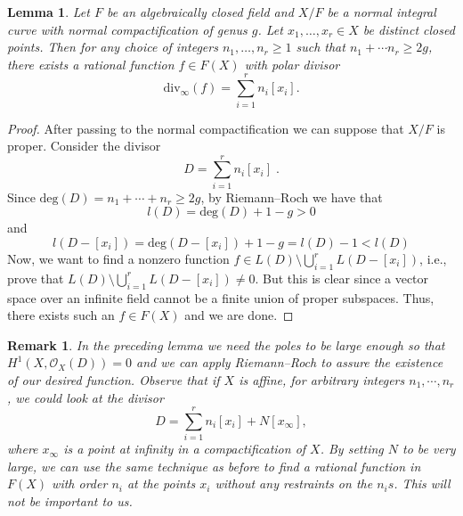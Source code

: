 \documentclass[a4paper,english,12pt]{amsart}
\newtheorem{lemma}[definition]{Lemma}
\newtheorem{remark}[definition]{Remark}
\numberwithin{equation}{section}
\renewcommand{\geq}{\geqslant}
\renewcommand{\_}{\rule{0.25cm}{0.4pt}}
\begin{document}
\begin{lemma}\label{approximation for curves}
    Let $F$ be an algebraically closed field and $X/F$ be a normal integral curve with normal compactification of genus $g$. Let $x_{1},\dots, x_{r}\in X$ be distinct closed points. Then for any choice of integers $n_{1},\dots, n_{r}\geq 1$ such that $n_{1}+\cdots n_{r}\geq 2g$, there exists a rational function $f\in F(X)$ with polar divisor
    \[
    \text{div}_{\infty}(f)=\sum_{i=1}^{r}n_{i}[x_{i}].
    \]
\end{lemma}
\begin{proof}
    After passing to the normal compactification we can suppose that $X/F$ is proper. Consider the divisor
    \[
    D=\sum_{i=1}^{r}n_{i}[x_{i}]\;.
    \]
    Since $\text{deg}(D)=n_{1}+\cdots +n_{r}\geq 2g$, by Riemann--Roch we have that
    \[
    l(D)=\text{deg}(D)+1-g>0
    \]
    and
    \[
    l(D-[x_{i}])=\text{deg}(D-[x_{i}])+1-g=l(D)-1< l(D)
    \]
    Now, we want to find a nonzero function $f\in L(D)\setminus \bigcup_{i=1}^{r}L(D-[x_{i}])$, i.e., prove that $L(D)\setminus \bigcup_{i=1}^{r}L(D-[x_{i}])\neq 0$. But this is clear since a vector space over an infinite field cannot be a finite union of proper subspaces.
    Thus, there exists such an $f\in F(X)$ and we are done.
\end{proof}

\begin{remark}
    In the preceding lemma we need the poles to be large enough so that $H^{1}(X,\mathcal{O}_{X}(D))=0$ and we can apply Riemann--Roch to assure the existence of our desired function. Observe that if $X$ is affine, for arbitrary integers $n_{1},\cdots, n_{r}$, we could look at the divisor
    \[
    D=\sum_{i=1}^{r}n_{i}[x_{i}]+N[x_{\infty}],
    \] 
    where $x_{\infty}$ is a point at infinity in a compactification of $X$. By setting $N$ to be very large, we can use the same technique as before to find a rational function in $F(X)$ with order $n_{i}$ at the points $x_{i}$ without any restraints on the $n_{i}s$. This will not be important to us.
\end{remark}
\end{document}
